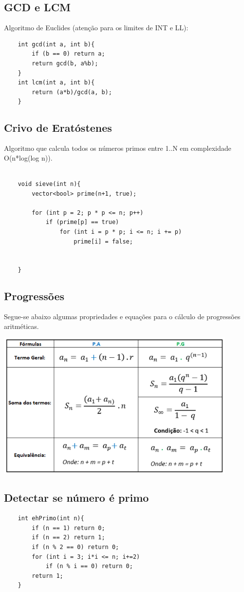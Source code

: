 \subsection{GCD e LCM}
\par Algoritmo de Euclides (atenção para os limites de INT e LL):
\begin{verbatim}
    int gcd(int a, int b){
        if (b == 0) return a;
        return gcd(b, a%b);
    }
    int lcm(int a, int b){
        return (a*b)/gcd(a, b);
    }
\end{verbatim}

\subsection{Crivo de Eratóstenes}
Algoritmo que calcula todos os números primos entre 1..N em complexidade \\
 O(n*log(log n)).
\begin{verbatim}
    
    void sieve(int n){
        vector<bool> prime(n+1, true);
    
        for (int p = 2; p * p <= n; p++) 
            if (prime[p] == true) 
                for (int i = p * p; i <= n; i += p)
                    prime[i] = false;
            
        
    }
\end{verbatim}

\subsection{Progressões}
    Segue-se abaixo algumas propriedades e equações para o cálculo de 
    progressões aritméticas.
    
    \includegraphics[width=120mm]{7_teoria_dos_numeros/PA_PG.png}

\subsection{Detectar se número é primo}
\begin{verbatim}
    int ehPrimo(int n){
        if (n == 1) return 0;
        if (n == 2) return 1;
        if (n % 2 == 0) return 0;
        for (int i = 3; i*i <= n; i+=2)
            if (n % i == 0) return 0;
        return 1;
    }
\end{verbatim}



\pagebreak
